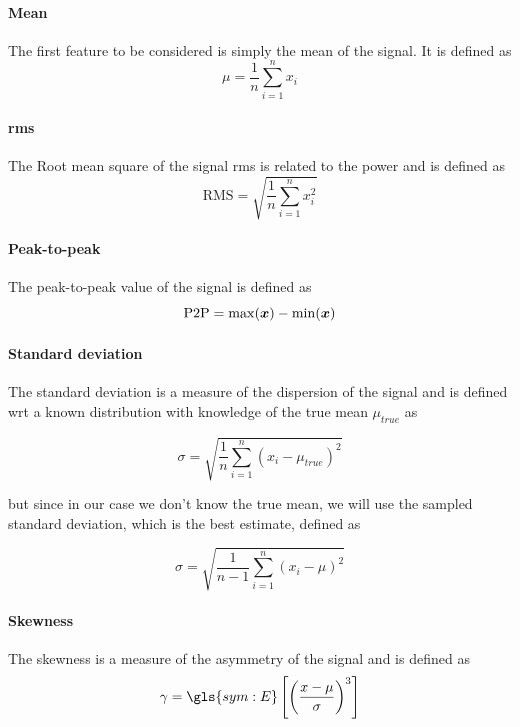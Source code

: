 \paragraph{Mean}
The first feature to be considered is simply the mean of the signal. It is defined as
\begin{equation}
    \mu = \frac{1}{n}\sum_{i=1}^n x_i
\end{equation}

\paragraph{\gls{rms}}
The Root mean square of the signal \gls{rms} is related to the power and is defined as
\begin{equation}
    \text{RMS} = \sqrt{\frac{1}{n}\sum_{i=1}^n x_i^2}
\end{equation}

\paragraph{Peak-to-peak}
The peak-to-peak value of the signal is defined as
\begin{equation}
    \text{P2P} = \max(\bm{x}) - \min(\bm{x})
\end{equation}

\paragraph{Standard deviation}
The standard deviation is a measure of the dispersion of the signal and is defined {\gls{wrt}} a known distribution with knowledge of the true mean $\mu_{true}$ as

\begin{equation}
    {\sigma} = \sqrt{\frac{1}{n}\sum_{i=1}^n (x_i - \mu_{true})^2}
\end{equation}

but since in our case we don't know the true mean, we will use the sampled standard deviation, which is the best estimate, defined as

\begin{equation}
    \hat{\sigma} = \sqrt{\frac{1}{n-1}\sum_{i=1}^n (x_i - \mu)^2}
\end{equation}

\paragraph{Skewness}
The skewness is a measure of the asymmetry of the signal and is defined as
\begin{equation}
    \gamma = \gls{sym:E}\left[ \left(\frac{x - \mu}{\sigma}\right)^3 \right]
\end{equation}

